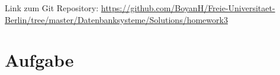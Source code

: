 \usepackage{graphicx}
\usepackage{fancyvrb}

\newcommand{\dozent}{Prof. Dr. Agn`es Voisard, Nicolas Lehmann}					%
\newcommand{\tutor}{Nicolas Lehmann}						%
\newcommand{\tutoriumNo}{10}				%
\newcommand{\projectNo}{2}									%
\newcommand{\veranstaltung}{Datenbanksysteme}	%
\newcommand{\semester}{SoSe 2017}						%
\newcommand{\studenten}{Boyan Hristov, Julian Habib}			%





Link zum Git Repository: \url{https://github.com/BoyanH/Freie-Universitaet-Berlin/tree/master/Datenbanksysteme/Solutions/homework3}

\section{Aufgabe}


